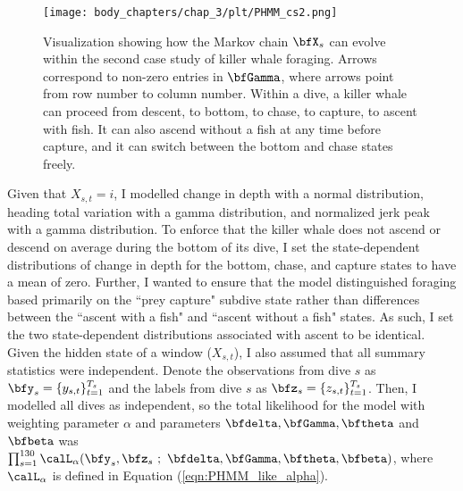\begin{figure}
    \centering
    \texttt{[image: body\_chapters/chap\_3/plt/PHMM\_cs2.png]}
    \caption[Visualization showing how the Markov chain $\bfX_s$ can evolve within the second case study of killer whale foraging.]{Visualization showing how the Markov chain $\bfX_s$ can evolve within the second case study of killer whale foraging. Arrows correspond to non-zero entries in $\bfGamma$, where arrows point from row number to column number. Within a dive, a killer whale can proceed from descent, to bottom, to chase, to capture, to ascent with fish. It can also ascend without a fish at any time before capture, and it can switch between the bottom and chase states freely.}
    \label{fig:PHMM_cs2}
\end{figure}


Given that $X_{s,t} = i$, I modelled change in depth with a normal distribution, heading total variation with a gamma distribution, and normalized jerk peak with a gamma distribution. To enforce that the killer whale does not ascend or descend on average during the bottom of its dive, I set the state-dependent distributions of change in depth for the bottom, chase, and capture states to have a mean of zero. Further, I wanted to ensure that the model distinguished foraging based primarily on the ``prey capture" subdive state rather than differences between the ``ascent with a fish" and ``ascent without a fish" states. As such, I set the two state-dependent distributions associated with ascent to be identical. Given the hidden state of a window ($X_{s,t}$), I also assumed that all summary statistics %
were independent. Denote the observations from dive $s$ as $\bfy_s = \{y_{s,t}\}_{t=1}^{T_s}$ and the labels from dive $s$ as $\bfz_s = \{z_{s,t}\}_{t=1}^{T_s}$. Then, I modelled all dives as independent, so the total likelihood for the model with weighting parameter $\alpha$ and parameters $\bfdelta, \bfGamma, \bftheta$ and $\bfbeta$ was $\prod_{s=1}^{130} \calL_\alpha (\bfy_s,\bfz_s ~;~ \bfdelta, \bfGamma, \bftheta,\bfbeta)$, where $\calL_\alpha$ is defined in Equation (\ref{eqn:PHMM_like_alpha}). 

